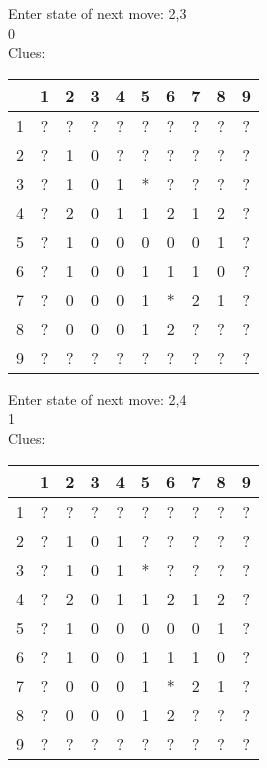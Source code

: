 Enter state of next move: 2,3\\
0\\
Clues:\\
\begin{tabular}{|c|c|c|c|c|c|c|c|c|c|}
\hline
  & 1 & 2 & 3 & 4 & 5 & 6 & 7 & 8 & 9\\
\hline
1 & ? & ? & ? & ? & ? & ? & ? & ? & ?\\
\hline
2 & ? & 1 & 0 & ? & ? & ? & ? & ? & ?\\
\hline
3 & ? & 1 & 0 & 1 & * & ? & ? & ? & ?\\
\hline
4 & ? & 2 & 0 & 1 & 1 & 2 & 1 & 2 & ?\\
\hline
5 & ? & 1 & 0 & 0 & 0 & 0 & 0 & 1 & ?\\
\hline
6 & ? & 1 & 0 & 0 & 1 & 1 & 1 & 0 & ?\\
\hline
7 & ? & 0 & 0 & 0 & 1 & * & 2 & 1 & ?\\
\hline
8 & ? & 0 & 0 & 0 & 1 & 2 & ? & ? & ?\\
\hline
9 & ? & ? & ? & ? & ? & ? & ? & ? & ?\\
\hline
\end{tabular}

Enter state of next move: 2,4\\
1\\
Clues:\\
\begin{tabular}{|c|c|c|c|c|c|c|c|c|c|}
\hline
  & 1 & 2 & 3 & 4 & 5 & 6 & 7 & 8 & 9\\
\hline
1 & ? & ? & ? & ? & ? & ? & ? & ? & ?\\
\hline
2 & ? & 1 & 0 & 1 & ? & ? & ? & ? & ?\\
\hline
3 & ? & 1 & 0 & 1 & * & ? & ? & ? & ?\\
\hline
4 & ? & 2 & 0 & 1 & 1 & 2 & 1 & 2 & ?\\
\hline
5 & ? & 1 & 0 & 0 & 0 & 0 & 0 & 1 & ?\\
\hline
6 & ? & 1 & 0 & 0 & 1 & 1 & 1 & 0 & ?\\
\hline
7 & ? & 0 & 0 & 0 & 1 & * & 2 & 1 & ?\\
\hline
8 & ? & 0 & 0 & 0 & 1 & 2 & ? & ? & ?\\
\hline
9 & ? & ? & ? & ? & ? & ? & ? & ? & ?\\
\hline
\end{tabular}

